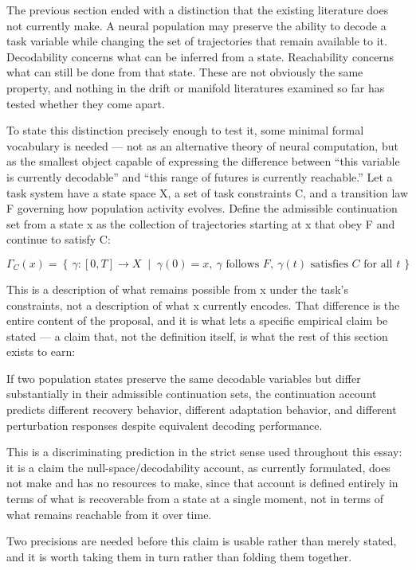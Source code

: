 \documentclass[11pt]{article}
\begin{document}
The previous section ended with a distinction that the existing literature does not currently make. A neural population may preserve the ability to decode a task variable while changing the set of trajectories that remain available to it. Decodability concerns what can be inferred from a state. Reachability concerns what can still be done from that state. These are not obviously the same property, and nothing in the drift or manifold literatures examined so far has tested whether they come apart.

To state this distinction precisely enough to test it, some minimal formal vocabulary is needed — not as an alternative theory of neural computation, but as the smallest object capable of expressing the difference between ``this variable is currently decodable'' and ``this range of futures is currently reachable.'' Let a task system have a state space X, a set of task constraints C, and a transition law F governing how population activity evolves. Define the admissible continuation set from a state x as the collection of trajectories starting at x that obey F and continue to satisfy C:

\[
\Gamma_C(x) = \left\{\, \gamma : [0,T] \to X \;\middle|\; \gamma(0) = x,\ \gamma \text{ follows } F,\ \gamma(t) \text{ satisfies } C \text{ for all } t \,\right\}
\]

This is a description of what remains possible from x under the task's constraints, not a description of what x currently encodes. That difference is the entire content of the proposal, and it is what lets a specific empirical claim be stated — a claim that, not the definition itself, is what the rest of this section exists to earn:

If two population states preserve the same decodable variables but differ substantially in their admissible continuation sets, the continuation account predicts different recovery behavior, different adaptation behavior, and different perturbation responses despite equivalent decoding performance.

This is a discriminating prediction in the strict sense used throughout this essay: it is a claim the null-space/decodability account, as currently formulated, does not make and has no resources to make, since that account is defined entirely in terms of what is recoverable from a state at a single moment, not in terms of what remains reachable from it over time.

Two precisions are needed before this claim is usable rather than merely stated, and it is worth taking them in turn rather than folding them together.
\end{document}
